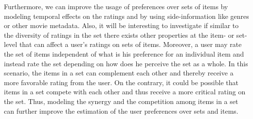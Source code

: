 Furthermore, we can improve the usage of preferences over sets of items by modeling temporal effects on the ratings and by using side-information like genres or other movie metadata. Also, it will be interesting to investigate if similar to the diversity of ratings in the set there exists other properties at the item- or set-level that can affect a user's ratings on sets of items.
Moreover, a user may rate the set of items independent of what is his preference for an individual item and instead rate the set depending on how does he perceive the set as a whole. In this scenario, the items in a set can complement each other and thereby receive a more favorable rating from the user. On the contrary, it could be possible that items in a set compete with each other and thus receive a more critical rating on the set. Thus, modeling the synergy and the competition among items in a set can further improve the estimation of the user preferences over sets and items.







